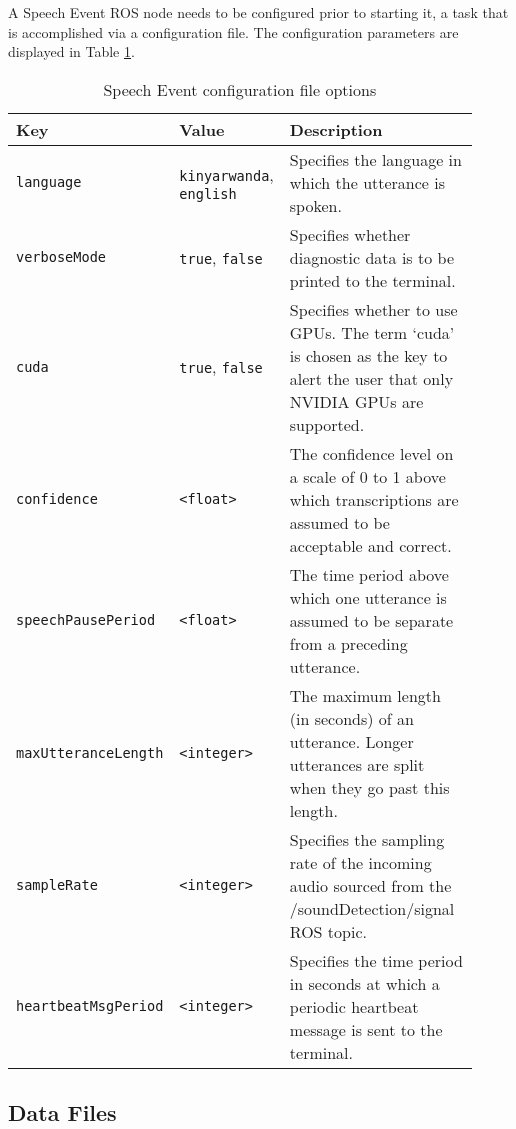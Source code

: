 \documentclass{CSSRforAfrica}
\begin{document}
A Speech Event ROS node needs to be configured prior to starting it, a task that is accomplished via a configuration file. The configuration parameters are displayed in Table \ref{table:speechEvent-config-file}.

\begin{center}
\begin{table}[thb]
\begin{tabular}[thb]{|p{0.27\linewidth}|p{0.20\linewidth}|p{0.45\linewidth}|}\hline
\rowcolor{lightgray} Key & Value & Description \\ \hline
\texttt{language} & \texttt{kinyarwanda}, \texttt{english} & Specifies the language in which the utterance is spoken. \\ \hline
\texttt{verboseMode} & \texttt{true}, \texttt{false} & Specifies whether diagnostic data is to be printed to the terminal. \\ \hline
\texttt{cuda} & \texttt{true}, \texttt{false} & Specifies whether to use GPUs. The term ‘cuda’ is chosen as the key to alert the user that only NVIDIA GPUs are supported. \\ \hline
\texttt{confidence} & \texttt{<float>} & The confidence level on a scale of 0 to 1 above which transcriptions are assumed to be acceptable and correct. \\ \hline
\texttt{speechPausePeriod} & \texttt{<float>} & The time period above which one utterance is assumed to be separate from a preceding utterance. \\ \hline
\texttt{maxUtteranceLength} & \texttt{<integer>} & The maximum length (in seconds) of an utterance. Longer utterances are split when they go past this length. \\ \hline
\texttt{sampleRate} & \texttt{<integer>} & Specifies the sampling rate of the incoming audio sourced from the /soundDetection/signal ROS topic. \\ \hline
\texttt{heartbeatMsgPeriod} & \texttt{<integer>} & Specifies the time period in seconds at which a periodic heartbeat message is sent to the terminal. \\ \hline
\end{tabular}
\caption{Speech Event configuration file options}
\label{table:speechEvent-config-file}
\end{table}
\end{center}

\subsection{Data Files}
\end{document}

